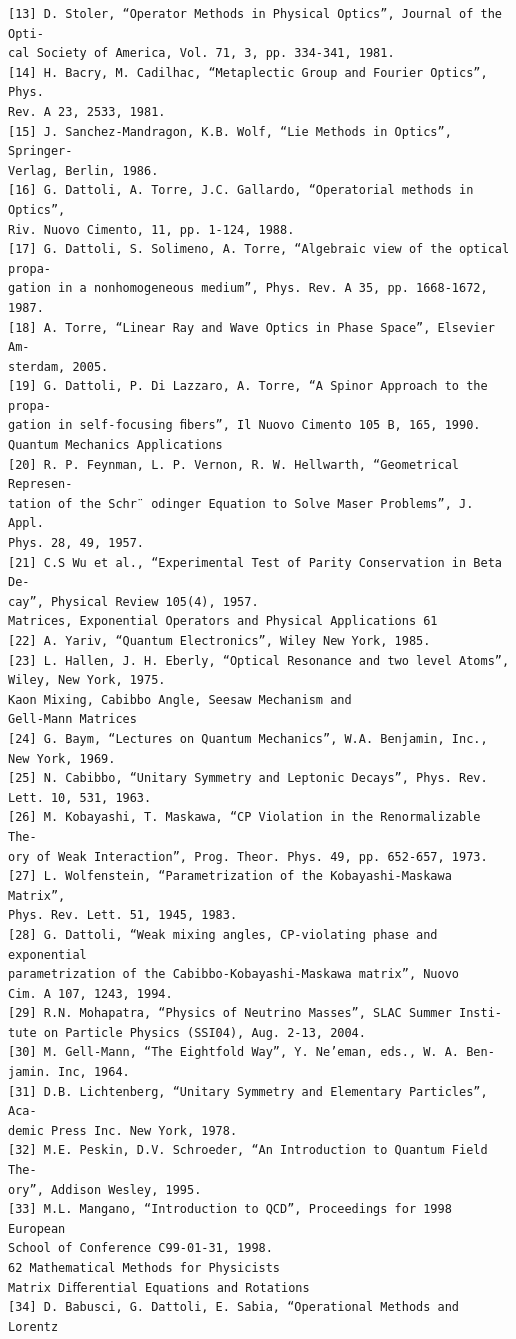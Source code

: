 \begin{verbatim}
[13] D. Stoler, “Operator Methods in Physical Optics”, Journal of the Opti-
cal Society of America, Vol. 71, 3, pp. 334-341, 1981.
[14] H. Bacry, M. Cadilhac, “Metaplectic Group and Fourier Optics”, Phys.
Rev. A 23, 2533, 1981.
[15] J. Sanchez-Mandragon, K.B. Wolf, “Lie Methods in Optics”, Springer-
Verlag, Berlin, 1986.
[16] G. Dattoli, A. Torre, J.C. Gallardo, “Operatorial methods in Optics”,
Riv. Nuovo Cimento, 11, pp. 1-124, 1988.
[17] G. Dattoli, S. Solimeno, A. Torre, “Algebraic view of the optical propa-
gation in a nonhomogeneous medium”, Phys. Rev. A 35, pp. 1668-1672,
1987.
[18] A. Torre, “Linear Ray and Wave Optics in Phase Space”, Elsevier Am-
sterdam, 2005.
[19] G. Dattoli, P. Di Lazzaro, A. Torre, “A Spinor Approach to the propa-
gation in self-focusing ﬁbers”, Il Nuovo Cimento 105 B, 165, 1990.
Quantum Mechanics Applications
[20] R. P. Feynman, L. P. Vernon, R. W. Hellwarth, “Geometrical Represen-
tation of the Schr¨ odinger Equation to Solve Maser Problems”, J. Appl.
Phys. 28, 49, 1957.
[21] C.S Wu et al., “Experimental Test of Parity Conservation in Beta De-
cay”, Physical Review 105(4), 1957.
Matrices, Exponential Operators and Physical Applications 61
[22] A. Yariv, “Quantum Electronics”, Wiley New York, 1985.
[23] L. Hallen, J. H. Eberly, “Optical Resonance and two level Atoms”,
Wiley, New York, 1975.
Kaon Mixing, Cabibbo Angle, Seesaw Mechanism and
Gell-Mann Matrices
[24] G. Baym, “Lectures on Quantum Mechanics”, W.A. Benjamin, Inc.,
New York, 1969.
[25] N. Cabibbo, “Unitary Symmetry and Leptonic Decays”, Phys. Rev.
Lett. 10, 531, 1963.
[26] M. Kobayashi, T. Maskawa, “CP Violation in the Renormalizable The-
ory of Weak Interaction”, Prog. Theor. Phys. 49, pp. 652-657, 1973.
[27] L. Wolfenstein, “Parametrization of the Kobayashi-Maskawa Matrix”,
Phys. Rev. Lett. 51, 1945, 1983.
[28] G. Dattoli, “Weak mixing angles, CP-violating phase and exponential
parametrization of the Cabibbo-Kobayashi-Maskawa matrix”, Nuovo
Cim. A 107, 1243, 1994.
[29] R.N. Mohapatra, “Physics of Neutrino Masses”, SLAC Summer Insti-
tute on Particle Physics (SSI04), Aug. 2-13, 2004.
[30] M. Gell-Mann, “The Eightfold Way”, Y. Ne’eman, eds., W. A. Ben-
jamin. Inc, 1964.
[31] D.B. Lichtenberg, “Unitary Symmetry and Elementary Particles”, Aca-
demic Press Inc. New York, 1978.
[32] M.E. Peskin, D.V. Schroeder, “An Introduction to Quantum Field The-
ory”, Addison Wesley, 1995.
[33] M.L. Mangano, “Introduction to QCD”, Proceedings for 1998 European
School of Conference C99-01-31, 1998.
62 Mathematical Methods for Physicists
Matrix Diﬀerential Equations and Rotations
[34] D. Babusci, G. Dattoli, E. Sabia, “Operational Methods and Lorentz

\end{verbatim}
